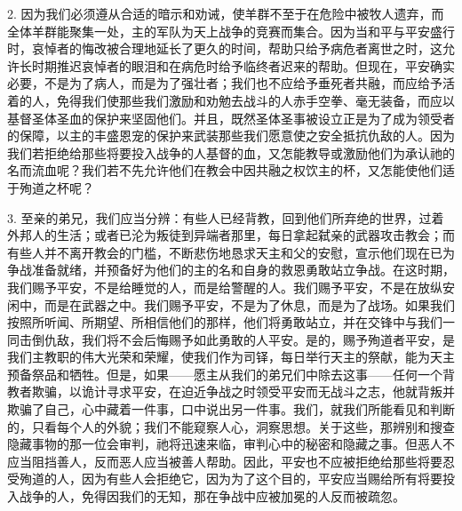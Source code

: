 2. 因为我们必须遵从合适的暗示和劝诫，使羊群不至于在危险中被牧人遗弃，而全体羊群能聚集一处，主的军队为天上战争的竞赛而集合。因为当和平与平安盛行时，哀悼者的悔改被合理地延长了更久的时间，帮助只给予病危者离世之时，这允许长时期推迟哀悼者的眼泪和在病危时给予临终者迟来的帮助。但现在，平安确实必要，不是为了病人，而是为了强壮者；我们也不应给予垂死者共融，而应给予活着的人，免得我们使那些我们激励和劝勉去战斗的人赤手空拳、毫无装备，而应以基督圣体圣血的保护来坚固他们。并且，既然圣体圣事被设立正是为了成为领受者的保障，以主的丰盛恩宠的保护来武装那些我们愿意使之安全抵抗仇敌的人。因为我们若拒绝给那些将要投入战争的人基督的血，又怎能教导或激励他们为承认祂的名而流血呢？我们若不先允许他们在教会中因共融之权饮主的杯，又怎能使他们适于殉道之杯呢？\par

3. 至亲的弟兄，我们应当分辨：有些人已经背教，回到他们所弃绝的世界，过着外邦人的生活；或者已沦为叛徒到异端者那里，每日拿起弑亲的武器攻击教会；而有些人并不离开教会的门槛，不断悲伤地恳求天主和父的安慰，宣示他们现在已为争战准备就绪，并预备好为他们的主的名和自身的救恩勇敢站立争战。在这时期，我们赐予平安，不是给睡觉的人，而是给警醒的人。我们赐予平安，不是在放纵安闲中，而是在武器之中。我们赐予平安，不是为了休息，而是为了战场。如果我们按照所听闻、所期望、所相信他们的那样，他们将勇敢站立，并在交锋中与我们一同击倒仇敌，我们将不会后悔赐予如此勇敢的人平安。是的，赐予殉道者平安，是我们主教职的伟大光荣和荣耀，使我们作为司铎，每日举行天主的祭献，能为天主预备祭品和牺牲。但是，如果——愿主从我们的弟兄们中除去这事——任何一个背教者欺骗，以诡计寻求平安，在迫近争战之时领受平安而无战斗之志，他就背叛并欺骗了自己，心中藏着一件事，口中说出另一件事。我们，就我们所能看见和判断的，只看每个人的外貌；我们不能窥察人心，洞察思想。关于这些，那辨别和搜查隐藏事物的那一位会审判，祂将迅速来临，审判心中的秘密和隐藏之事。但恶人不应当阻挡善人，反而恶人应当被善人帮助。因此，平安也不应被拒绝给那些将要忍受殉道的人，因为有些人会拒绝它，因为为了这个目的，平安应当赐给所有将要投入战争的人，免得因我们的无知，那在争战中应被加冕的人反而被疏忽。\par

